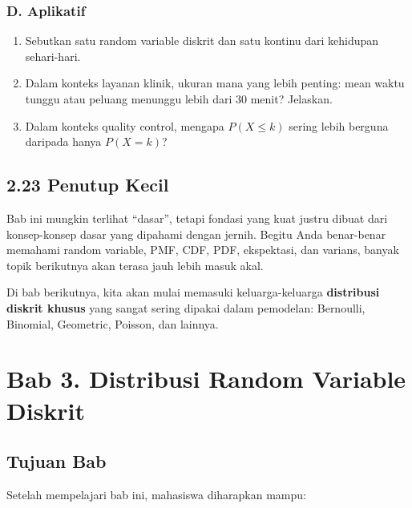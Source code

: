 \documentclass[
  letterpaper,
  DIV=11,
  numbers=noendperiod]{scrreprt}
\providecommand{\tightlist}{%
  \setlength{\itemsep}{0pt}\setlength{\parskip}{0pt}}
\begin{document}
\subsection{D. Aplikatif}\label{d.-aplikatif}

\begin{enumerate}
\def\labelenumi{\arabic{enumi}.}
\tightlist
\item
  Sebutkan satu random variable diskrit dan satu kontinu dari kehidupan
  sehari-hari.
\item
  Dalam konteks layanan klinik, ukuran mana yang lebih penting: mean
  waktu tunggu atau peluang menunggu lebih dari 30 menit? Jelaskan.
\item
  Dalam konteks quality control, mengapa \(P(X\le k)\) sering lebih
  berguna daripada hanya \(P(X=k)\)?
\end{enumerate}

\section{2.23 Penutup Kecil}\label{penutup-kecil-1}

Bab ini mungkin terlihat ``dasar'', tetapi fondasi yang kuat justru
dibuat dari konsep-konsep dasar yang dipahami dengan jernih. Begitu Anda
benar-benar memahami random variable, PMF, CDF, PDF, ekspektasi, dan
varians, banyak topik berikutnya akan terasa jauh lebih masuk akal.

Di bab berikutnya, kita akan mulai memasuki keluarga-keluarga
\textbf{distribusi diskrit khusus} yang sangat sering dipakai dalam
pemodelan: Bernoulli, Binomial, Geometric, Poisson, dan lainnya.


\chapter{Bab 3. Distribusi Random Variable
Diskrit}\label{bab-3.-distribusi-random-variable-diskrit}

\section{Tujuan Bab}\label{tujuan-bab-2}

Setelah mempelajari bab ini, mahasiswa diharapkan mampu:
\end{document}
